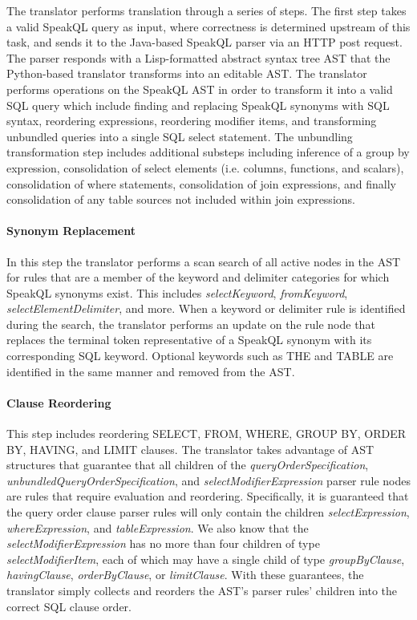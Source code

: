 The translator performs translation through a series of steps. The first step takes a valid SpeakQL query as input, where correctness is determined upstream of this task, and sends it to the Java-based SpeakQL parser via an HTTP post request. The parser responds with a Lisp-formatted abstract syntax tree AST that the Python-based translator transforms into an editable AST. The translator performs operations on the SpeakQL AST in order to transform it into a valid SQL query which include finding and replacing SpeakQL synonyms with SQL syntax, reordering expressions, reordering modifier items, and transforming unbundled queries into a single SQL select statement. The unbundling transformation step includes additional substeps including inference of a group by expression, consolidation of select elements (i.e. columns, functions, and scalars), consolidation of where statements, consolidation of join expressions, and finally consolidation of any table sources not included within join expressions.



\paragraph{\textbf{Synonym Replacement}} 
In this step the translator performs a scan search of all active nodes in the AST for rules that are a member of the keyword and delimiter categories for which SpeakQL synonyms exist. 
This includes \emph{selectKeyword}, \emph{fromKeyword}, \emph{selectElementDelimiter}, and more. 
When a keyword or delimiter rule is identified during the search, the translator performs an update on the rule node that replaces the terminal token representative of a SpeakQL synonym with its corresponding SQL keyword. 
Optional keywords such as THE and TABLE are identified in the same manner and removed from the AST.

\ReplaceSynonymsAlgorithm

\paragraph{\textbf{Clause Reordering}}
This step includes reordering SELECT, FROM, WHERE, GROUP BY, ORDER BY, HAVING, and LIMIT clauses. 
The translator takes advantage of AST structures that guarantee that all children of the \emph{queryOrderSpecification}, \emph{unbundledQueryOrderSpecification}, and \emph{selectModifierExpression} parser rule nodes are rules that require evaluation and reordering. 
Specifically, it is guaranteed that the query order clause parser rules will only contain the children \emph{selectExpression}, \emph{whereExpression}, and \emph{tableExpression}. 
We also know that the \emph{selectModifierExpression} has no more than four children of type \emph{selectModifierItem}, each of which may have a single child of type \emph{groupByClause}, \emph{havingClause}, \emph{orderByClause}, or \emph{limitClause}. 
With these guarantees, the translator simply collects and reorders the AST's parser rules' children into the correct SQL clause order.

